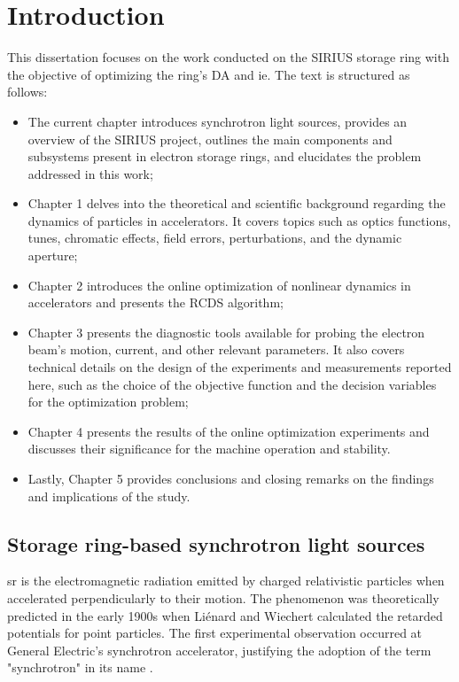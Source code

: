 \chapter*{Introduction}
This dissertation focuses on the work conducted on the SIRIUS storage ring with the objective of optimizing the ring's \gls*{DA} and \gls*{ie}. The text is structured as follows:
\begin{itemize}
    \item The current chapter introduces synchrotron light sources, provides an overview of the SIRIUS project, outlines the main components and subsystems present in electron storage rings, and elucidates the problem addressed in this work;
    \item Chapter 1 delves into the theoretical and scientific background regarding the dynamics of particles in accelerators. It covers topics such as optics functions, tunes, chromatic effects, field errors, perturbations, and the dynamic aperture;
    \item Chapter 2 introduces the online optimization of nonlinear dynamics in accelerators and presents the \gls*{RCDS} algorithm;
    \item Chapter 3 presents the diagnostic tools available for probing the electron beam's motion, current, and other relevant parameters. It also covers technical details on the design of the experiments and measurements reported here, such as the choice of the objective function and the decision variables for the optimization problem;
    \item Chapter 4 presents the results of the online optimization experiments and discusses their significance for the machine operation and stability.
    \item Lastly, Chapter 5 provides conclusions and closing remarks on the findings and implications of the study.
\end{itemize}

\section*{Storage ring-based synchrotron light sources}

\gls*{sr} is the electromagnetic radiation emitted by charged relativistic particles when accelerated perpendicularly to their motion. The phenomenon was theoretically predicted in the early 1900s when Liénard and Wiechert calculated the retarded potentials for point particles. The first experimental observation occurred at General Electric's synchrotron accelerator, justifying the adoption of the term "synchrotron" in its name \cite{wiedemann_particle_2015}. 

